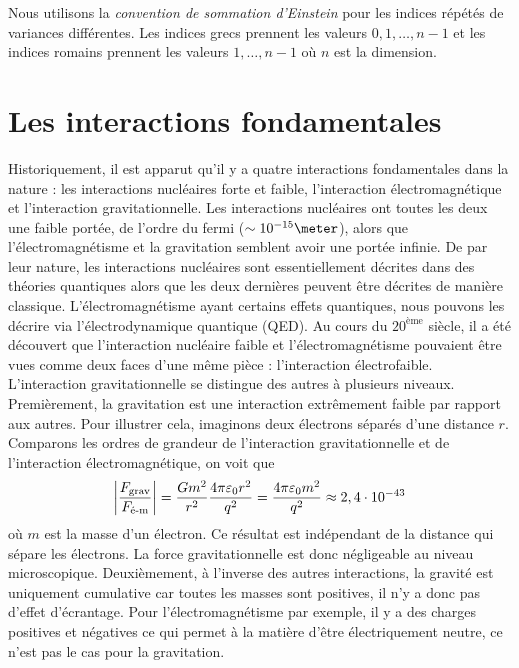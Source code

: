 \documentclass[a4paper,11pt]{report}
\theoremstyle{definition}
\theoremstyle{plain}
\theoremstyle{definition}
\theoremstyle{remark}
\begin{document}
        Nous utilisons la \textit{convention de sommation d'Einstein} pour les indices répétés de variances différentes. Les indices grecs prennent les valeurs $0,1,\dots,n-1$ et les indices romains prennent les valeurs $1,\dots,n-1$ où $n$ est la dimension.

    \section{Les interactions fondamentales}
    
        Historiquement, il est apparut qu'il y a quatre interactions fondamentales dans la nature : les interactions nucléaires forte et faible, l'interaction électromagnétique et l'interaction gravitationnelle. Les interactions nucléaires ont toutes les deux une faible portée, de l'ordre du fermi ($\sim10^{-15}\meter$), alors que  l'électromagnétisme et la gravitation semblent avoir une portée infinie. De par leur nature, les interactions nucléaires sont essentiellement décrites dans des théories quantiques alors que les deux dernières peuvent être décrites de manière classique. L'électromagnétisme ayant certains effets quantiques, nous pouvons les décrire via l'électrodynamique quantique (QED). Au cours du $20^{\text{ème}}$ siècle, il a été découvert que l'interaction nucléaire faible et l'électromagnétisme pouvaient être vues comme deux faces d'une même pièce : l'interaction électrofaible.\\
        
        L'interaction gravitationnelle se distingue des autres à plusieurs niveaux. Premièrement, la gravitation est une interaction extrêmement faible par rapport aux autres. Pour illustrer cela, imaginons deux électrons séparés d'une distance $r$. Comparons les ordres de grandeur de l'interaction gravitationnelle et de l'interaction électromagnétique, on voit que
        \begin{equation}
            \abs{\frac{F_{\text{grav}}}{F_{\text{é-m}}}} = \frac{Gm^2}{r^2}\frac{4\pi\varepsilon_0r^2}{q^2} = \frac{4\pi\varepsilon_0 m^2}{q^2} \approx 2,4\cdot10^{-43}
        \end{equation}
        où $m$ est la masse d'un électron. Ce résultat est indépendant de la distance qui sépare les électrons. La force gravitationnelle est donc négligeable au niveau microscopique. Deuxièmement, à l'inverse des autres interactions, la gravité est uniquement cumulative car toutes les masses sont positives, il n'y a donc pas d'effet d'écrantage. Pour l'électromagnétisme par exemple, il y a des charges positives et négatives ce qui permet à la matière d'être électriquement neutre, ce n'est pas le cas pour la gravitation.\\
        
\end{document}
